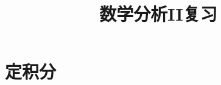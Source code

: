 \everymath{\displaystyle}



\title[数分II\\
复习]{\texorpdfstring{\Huge \bfseries 数学分析II复习}{数学分析II复习}} %
\date{}





\begin{frame}

\titlepage %

\end{frame}




\section{定积分}

